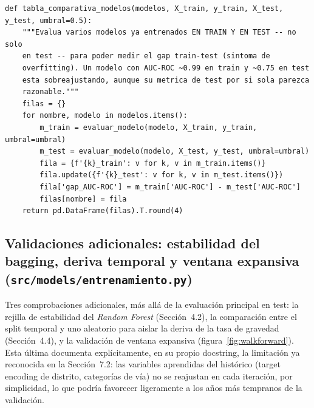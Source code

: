 \documentclass[11pt,a4paper]{article}
\begin{document}
\begin{lstlisting}[caption={Exploración manual de una rejilla de hiperparámetros, con validación temporal dentro de entrenamiento.}]
def tabla_comparativa_modelos(modelos, X_train, y_train, X_test, y_test, umbral=0.5):
    """Evalua varios modelos ya entrenados EN TRAIN Y EN TEST -- no solo
    en test -- para poder medir el gap train-test (sintoma de
    overfitting). Un modelo con AUC-ROC ~0.99 en train y ~0.75 en test
    esta sobreajustando, aunque su metrica de test por si sola parezca
    razonable."""
    filas = {}
    for nombre, modelo in modelos.items():
        m_train = evaluar_modelo(modelo, X_train, y_train, umbral=umbral)
        m_test = evaluar_modelo(modelo, X_test, y_test, umbral=umbral)
        fila = {f'{k}_train': v for k, v in m_train.items()}
        fila.update({f'{k}_test': v for k, v in m_test.items()})
        fila['gap_AUC-ROC'] = m_train['AUC-ROC'] - m_test['AUC-ROC']
        filas[nombre] = fila
    return pd.DataFrame(filas).T.round(4)
\end{lstlisting}

\subsection{Validaciones adicionales: estabilidad del bagging, deriva temporal y ventana expansiva (\texttt{src/models/entrenamiento.py})}
\label{app:validaciones}

Tres comprobaciones adicionales, más allá de la evaluación principal en test: la rejilla de estabilidad del \emph{Random Forest} (Sección~4.2), la comparación entre el split temporal y uno aleatorio para aislar la deriva de la tasa de gravedad (Sección~4.4), y la validación de ventana expansiva (figura~\ref{fig:walkforward}). Esta última documenta explícitamente, en su propio docstring, la limitación ya reconocida en la Sección~7.2: las variables aprendidas del histórico (target encoding de distrito, categorías de vía) no se reajustan en cada iteración, por simplicidad, lo que podría favorecer ligeramente a los años más tempranos de la validación.
\end{document}
